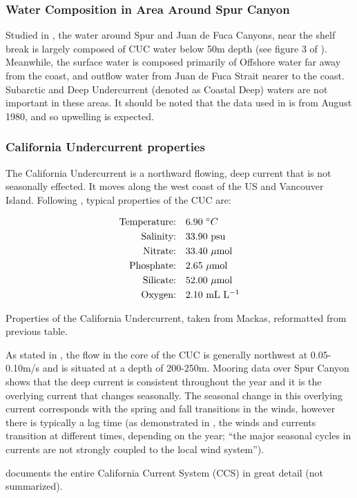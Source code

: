 \documentclass[12pt]{extreport}
\begin{document}
\subsubsection{Water Composition in Area Around Spur Canyon}

Studied in \cite{mackas1987least}, the water around Spur and Juan de Fuca Canyons, near the shelf break is largely composed of CUC water below 50m depth (see figure 3 of \cite{mackas1987least}). Meanwhile, the surface water is composed primarily of Offshore water far away from the coast, and outflow water from Juan de Fuca Strait nearer to the coast. Subarctic and Deep Undercurrent (denoted as Coastal Deep) waters are not important in these areas. It should be noted that the data used in \cite{mackas1987least} is from August 1980, and so upwelling is expected. 

\subsubsection{California Undercurrent properties}

The California Undercurrent is a northward flowing, deep current that is not seasonally effected. It moves along the west coast of the US and Vancouver Island. Following \cite{mackas1987least}, typical properties of the CUC are:

\begin{table}[h!]
\centering
\begin{align*}
 \hbox{Temperature:}\quad& 6.90 \hbox{ $^\circ C$}\\
 \hbox{Salinity:}\quad& 33.90 \hbox{ psu} \\
 \hbox{Nitrate:}\quad& 33.40 \hbox{ $\mu$mol} \\
 \hbox{Phosphate:}\quad& 2.65 \hbox{ $\mu$mol} \\
 \hbox{Silicate:}\quad& 52.00 \hbox{ $\mu$mol} \\
 \hbox{Oxygen:}\quad& 2.10 \hbox{ mL L$^{-1}$}
\end{align*}
\caption{Properties of the California Undercurrent, taken from Mackas, reformatted from previous table.}
\end{table}

As stated in \cite{vindeirinho1998water}, the flow in the core of the CUC is generally northwest at 0.05-0.10m/s and is situated at a depth of 200-250m. Mooring data over Spur Canyon shows that the deep current is consistent throughout the year and it is the overlying current that changes seasonally. The seasonal change in this overlying current corresponds with the spring and fall transitions in the winds, however there is typically a lag time (as demonstrated in 
\cite{freeland1982topographically}
, the winds and currents transition at different times, depending on the year; ``the major seasonal cycles in currents are not strongly coupled to the local wind system''). 

\cite{hickey1979california} documents the entire California Current System (CCS) in great detail (not summarized).








\end{document}
